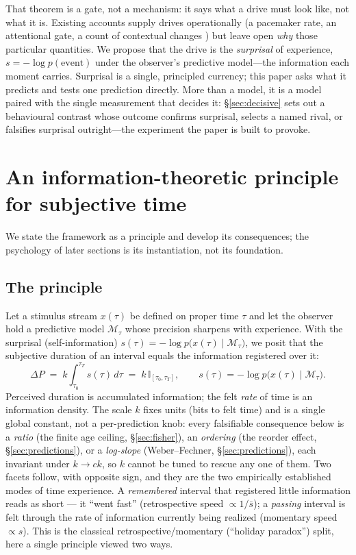 \documentclass[11pt]{article}
\begin{document}
That theorem is a gate, not a mechanism: it says what a drive must look like, not what
it is. Existing accounts supply drives operationally (a pacemaker rate, an
attentional gate, a count of contextual changes \citep{treisman1963temporal,
zakay1997temporal, block1978remembered}) but leave open \emph{why} those particular
quantities. We propose that the drive is the \emph{surprisal} of experience,
$s=-\log p(\text{event})$ under the observer's predictive model---the information each
moment carries. Surprisal is a single, principled currency; this paper asks what it
predicts and tests one prediction directly. More than a model, it is a model
paired with the single measurement that decides it: \S\ref{sec:decisive} sets out
a behavioural contrast whose outcome confirms surprisal, selects a named rival, or
falsifies surprisal outright---the experiment the paper is built to provoke.

\section{An information-theoretic principle for subjective time}
We state the framework as a principle and develop its consequences; the psychology of
later sections is its instantiation, not its foundation.

\subsection{The principle}
Let a stimulus stream $x(\tau)$ be defined on proper time $\tau$ and let the observer hold
a predictive model $\mathcal{M}_\tau$ whose precision sharpens with experience. With the
surprisal (self-information) $s(\tau)=-\log p\big(x(\tau)\mid\mathcal{M}_\tau\big)$, we
posit that the subjective duration of an interval equals the information registered over it:
\begin{equation}
\Delta P \;=\; k\!\int_{\tau_0}^{\tau_T} s(\tau)\,d\tau \;=\; k\,\mathbb{I}_{[\tau_0,\tau_T]},
\qquad s(\tau) = -\log p\big(x(\tau)\mid \mathcal{M}_\tau\big).
\label{eq:principle}
\end{equation}
Perceived duration is accumulated information; the felt \emph{rate} of time is an
information density. The scale $k$ fixes units (bits to felt time) and is a single
global constant, not a per-prediction knob: every falsifiable consequence below is a
\emph{ratio} (the finite age ceiling, \S\ref{sec:fisher}), an \emph{ordering} (the
reorder effect, \S\ref{sec:predictions}), or a \emph{log-slope} (Weber--Fechner,
\S\ref{sec:predictions}), each invariant under $k\to ck$, so $k$ cannot be tuned to
rescue any one of them. Two facets follow, with opposite sign, and they are the two
empirically established modes of time experience. A \emph{remembered} interval that
registered little information reads as short --- it ``went fast'' (retrospective speed
$\propto 1/\bar s$); a \emph{passing} interval is felt through the rate of information
currently being realized (momentary speed $\propto s$). This is the classical
retrospective/momentary (``holiday paradox'') split, here a single principle viewed two ways.
\end{document}

